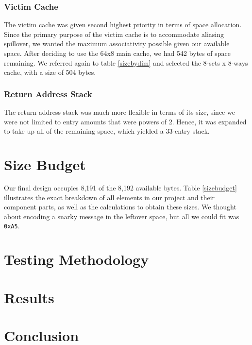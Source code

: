 \documentclass[twocolumn]{article}
\begin{document}
\subsubsection{Victim Cache}
The victim cache was given second highest priority in terms of space allocation.  Since the primary purpose of the victim cache is to accommodate aliasing spillover, we wanted the maximum associativity possible given our available space.   After deciding to use the 64x8 main cache, we had 542 bytes of space remaining.  We referred again to table \ref{sizebydim} and selected the 8-sets x 8-ways cache, with a size of 504 bytes.  
\subsubsection{Return Address Stack}
The return address stack was much more flexible in terms of its size, since we were not limited to entry amounts that were powers of 2.  Hence, it was expanded to take up all of the remaining space, which yielded a 33-entry stack. 

\section{Size Budget}
Our final design occupies 8,191 of the 8,192 available bytes. Table \ref{sizebudget} illustrates the exact breakdown of all elements in our project and their component parts, as well as the calculations to obtain these sizes.  We thought about encoding a snarky message in the leftover space, but all we could fit was \texttt{0xA5}.
\section{Testing Methodology}
\section{Results}
\section{Conclusion}
\appendix
\onecolumn
\end{document}
